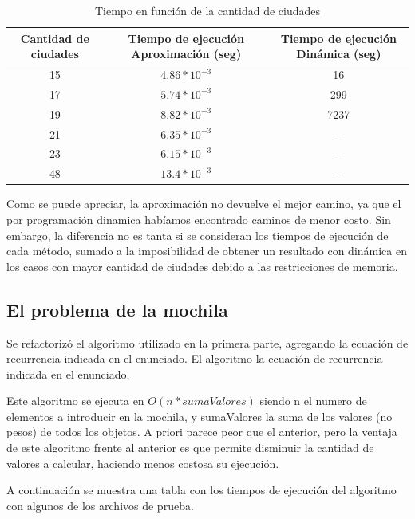\documentclass[a4paper,10pt]{article}
\begin{document}
\begin{table}[H]
\centering
\begin{tabular}{|c|c|c|}
\hline
Cantidad de ciudades	& Tiempo de ejecución Aproximación (seg)	& Tiempo de ejecución Dinámica (seg)\\\hline
15						& $4.86 * 10^{-3}$							& 16	\\\hline
17						& $5.74 * 10^{-3}$							& 299	\\\hline
19						& $8.82 * 10^{-3}$							& 7237	\\\hline
21						& $6.35 * 10^{-3}$							& ---	\\\hline
23						& $6.15 * 10^{-3}$							& ---	\\\hline
48						& $13.4 * 10^{-3}$							& ---	\\\hline
\end{tabular}
\caption{Tiempo en función de la cantidad de ciudades}
\label{tab:held}
\end{table}


Como se puede apreciar, la aproximación no devuelve el mejor camino, ya que el por programación dinamica habíamos encontrado caminos de menor costo. Sin embargo, la diferencia no es tanta si se consideran los tiempos de ejecución de cada método, sumado a la imposibilidad de obtener un resultado con dinámica en los casos con mayor cantidad de ciudades debido a las restricciones de memoria.

\subsection{El problema de la mochila}

Se refactorizó el algoritmo utilizado en la primera parte, agregando la ecuación de recurrencia indicada en el enunciado. El algoritmo la ecuación de recurrencia indicada en el enunciado.

Este algoritmo se ejecuta en $O(n * sumaValores)$ siendo n el numero de elementos a introducir en la mochila, y sumaValores la suma de los valores (no pesos) de todos los objetos. A priori parece peor que el anterior, pero la ventaja de este algoritmo frente al anterior es que permite disminuir la cantidad de valores a calcular, haciendo menos costosa su ejecución.

A continuación se muestra una tabla con los tiempos de ejecución del algoritmo con algunos de los archivos de prueba.
\end{document}
